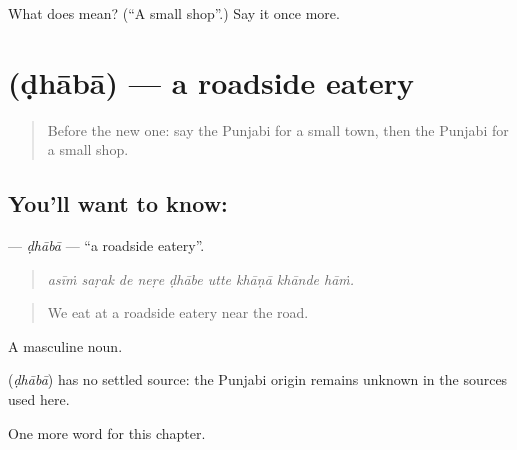\begin{tcolorbox}[breakable,colback=teal!4,colframe=teal!35!black,title={Before you move on}]
What does  mean? (\textquotedblleft{}A small shop\textquotedblright{}.) Say it once more.
\end{tcolorbox}
\section[\texorpdfstring{\pa{ਢਾਬਾ} (ḍhābā)}{ਢਾਬਾ (ḍhābā)}]{ (ḍhābā) — a roadside eatery}

\label{lesson:PA-C266-dhaba}



\begin{quote}
Before the new one: say the Punjabi for a small town, then the Punjabi for a small shop.
\end{quote}

\subsection*{You'll want to know: }
\textbf{} — \emph{ḍhābā} — \textquotedblleft{}a roadside eatery\textquotedblright{}.

\begin{quote}
        
\end{quote}

\begin{quote}
\emph{asīṁ saṛak de neṛe ḍhābe utte khāṇā khānde hāṁ.}
\end{quote}

\begin{quote}
We eat at a roadside eatery near the road.
\end{quote}

A masculine noun.

\begin{cousinweb}
\textbf{} (\emph{ḍhābā}) has no settled source: the Punjabi origin remains unknown in the sources used here.
\end{cousinweb}

\begin{grammarlens}[title={What you've built}]
One more word for this chapter.
\end{grammarlens}

